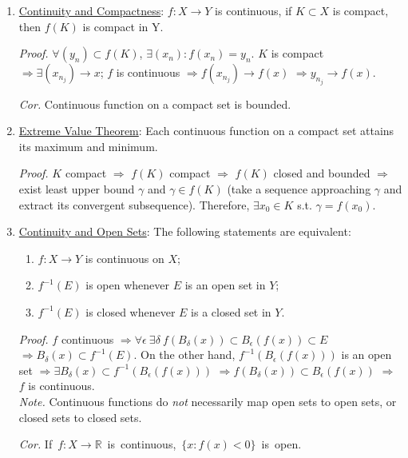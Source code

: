 \documentclass[%
 aip,
 jmp,%
 amsmath,amssymb,
 reprint,%
]{revtex4-1}
\def\R{{\mathbb R}}
\def\d{\delta}
\def\e{\epsilon}
\renewenvironment{proof}{\color{gray}\footnotesize\emph{Proof.}}{}
\newcommand{\imply}{\Rightarrow}
\newcommand{\defn}[1]{\underline{#1}}
\begin{document}
\begin{enumerate}
  \item \defn{Continuity and Compactness}:  $f: X \to Y$ is continuous,
  if $K \subset X$ is compact, then $f(K)$ is compact in Y.

      \begin{proof}
        $\forall (y_n) \subset f(K)$, $\exists (x_n): f(x_n)=y_n$.
        $K$ is compact $\imply \exists (x_{n_j}) \to x$;
        $f$ is continuous $\imply f(x_{n_j}) \to f(x)$ $\imply y_{n_j} \to f(x)$.
      \end{proof}

      \emph{Cor.} Continuous function on a compact set is bounded.


  \item \defn{Extreme Value Theorem}: Each continuous function on a compact
  set attains its maximum and minimum.

      \begin{proof}
        $K$ compact $\imply$ $f(K)$ compact $\imply$ $f(K)$ closed and bounded
        $\imply$ exist least upper bound $\gamma$ and $\gamma \in f(K)$
        (take a sequence approaching $\gamma$ and extract its convergent
        subsequence). Therefore, $\exists x_0 \in K$ s.t. $\gamma=f(x_0)$.
      \end{proof}

  \item \defn{Continuity and Open Sets}: The following statements are equivalent:
      \begin{enumerate}
        \item $f: X \to Y$ is continuous on $X$;
        \item $f^{-1}(E)$ is open whenever $E$ is an open set in $Y$;
        \item $f^{-1}(E)$ is closed whenever $E$ is a closed set in $Y$.
      \end{enumerate}
      \begin{proof}
        $f$ continuous $\imply \forall\e\ \exists\d\ f(B_{\d}(x)) \subset B_{\e}(f(x)) \subset E$
        $\imply B_{\d}(x) \subset f^{-1}(E)$.
        On the other hand, $f^{-1}(B_{\e}(f(x)))$ is an open set
        $\imply \exists B_{\d}(x) \subset f^{-1}(B_{\e}(f(x)))$
        $\imply f(B_{\d}(x)) \subset B_{\e}(f(x))$ $\imply$ $f$ is continuous.
      \end{proof} \\

      \emph{Note.} Continuous functions do \emph{not} necessarily
      map open sets to open sets, or closed sets to closed sets.

      \emph{Cor.} \mbox{If $f: X\to\R$ is continuous, $\{x: f(x)<0\}$ is open.}

\end{enumerate}
\end{document}

